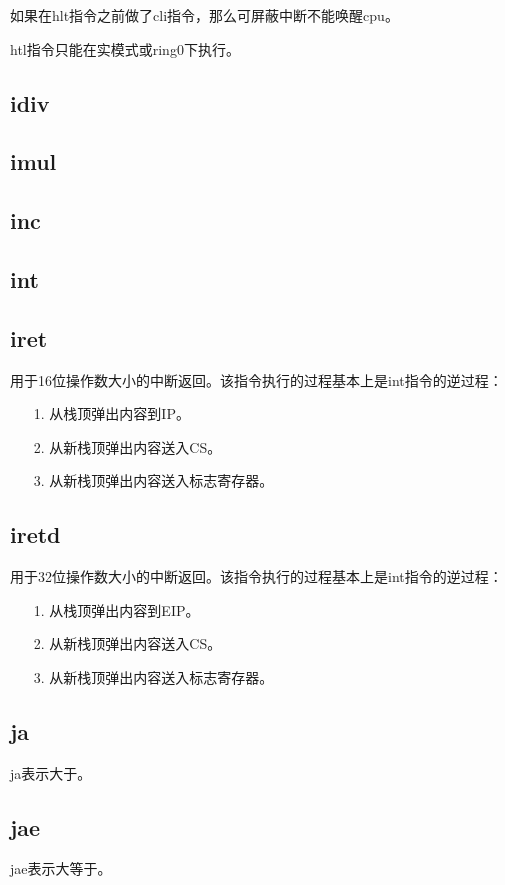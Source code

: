 \documentclass[a4paper,left=2.5cm,right=2.5cm,11pt]{article}
\begin{document}
	如果在hlt指令之前做了cli指令，那么可屏蔽中断不能唤醒cpu。\par

	htl指令只能在实模式或ring0下执行。

\subsection{idiv}
\subsection{imul}
\subsection{inc}
\subsection{int}
\subsection{iret}
	用于16位操作数大小的中断返回。该指令执行的过程基本上是int指令的逆过程：
	\begin{itemize}
		\item[1.] 从栈顶弹出内容到IP。
		\item[2.] 从新栈顶弹出内容送入CS。
		\item[3.] 从新栈顶弹出内容送入标志寄存器。
	\end{itemize}

\subsection{iretd}
	用于32位操作数大小的中断返回。该指令执行的过程基本上是int指令的逆过程：
	\begin{itemize}
		\item[1.] 从栈顶弹出内容到EIP。
		\item[2.] 从新栈顶弹出内容送入CS。
		\item[3.] 从新栈顶弹出内容送入标志寄存器。
	\end{itemize}

\subsection{ja}
	ja表示大于。

\subsection{jae}
	jae表示大等于。
\end{document}

